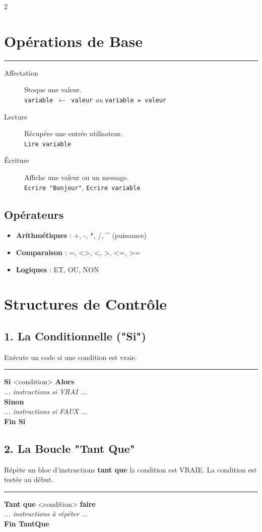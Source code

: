 \documentclass[10pt,a4paper]{article}
\newcommand{\code}[1]{\texttt{#1}}
\begin{document}
\begin{multicols}{2}
\section*{Opérations de Base}
\hrule
\begin{description}
    \item[Affectation] Stoque une valeur. \\ \code{variable $\leftarrow$ valeur} \textit{ ou } \code{variable = valeur}
    \item[Lecture] Récupère une entrée utilisateur. \\ \code{Lire variable}
    \item[Écriture] Affiche une valeur ou un message. \\ \code{Ecrire "Bonjour"}, \code{Ecrire variable}
\end{description}

\subsection*{Opérateurs}
\begin{itemize}
    \item \textbf{Arithmétiques} : +, -, *, /, \textasciicircum{} (puissance)
    \item \textbf{Comparaison} : =, <>, <, >, <=, >= 
    \item \textbf{Logiques} : ET, OU, NON
\end{itemize}

\columnbreak

\section*{Structures de Contrôle}

\subsection*{1. La Conditionnelle ("Si")}
Exécute un code si une condition est vraie.
\hrule
\vspace{1mm}
\textbf{Si} <condition> \textbf{Alors} \\
\quad \textit{... instructions si VRAI ...} \\
\textbf{Sinon} \\
\quad \textit{... instructions si FAUX ...} \\
\textbf{Fin Si}

\subsection*{2. La Boucle "Tant Que"}
Répète un bloc d'instructions \textbf{tant que} la condition est VRAIE. La condition est testée au début.
\hrule
\vspace{1mm}
\textbf{Tant que} <condition> \textbf{faire} \\
\quad \textit{... instructions à répéter ...} \\
\textbf{Fin TantQue}


\end{multicols}
\end{document}
